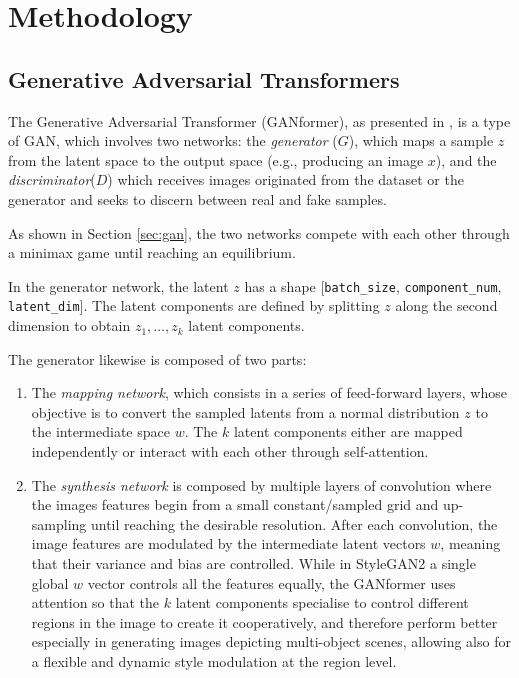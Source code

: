 \documentclass{article}
\begin{document}
	\section{Methodology}
	
	\subsection{Generative Adversarial Transformers}%
	The Generative Adversarial Transformer (GANformer), as presented in \cite{hudson2021generative}, 
	is a type of GAN, which involves two networks: the \textit{generator} (${G}$), which maps a sample 
	$z$ from the latent space to the output space (e.g., producing an image $x$), and the 
	\textit{discriminator}(${D}$) which receives images originated from the dataset or the generator and 
	seeks to discern between real and fake samples. 
	
	As shown in Section \ref{sec:gan}, the two networks compete with each other through a minimax 
	game until reaching an equilibrium. 
	
	In the generator network, the latent $z$ has a shape 
	[\texttt{batch\_size}, \texttt{component\_num}, \texttt{latent\_dim}]. 
	The latent components are defined by splitting $z$ along the second dimension to obtain $z_1, 
	\dots, z_k$ latent components.
	
	The generator likewise is composed of two parts:
	\begin{enumerate}
		\item The \textit{mapping network}, which consists in a series of feed-forward layers, whose 
		objective is to convert the sampled latents from a normal distribution $z$ to the intermediate 
		space $w$. The $k$ latent components either are mapped independently or interact with each 
		other through self-attention.
		\item The \textit{synthesis network} is composed by multiple layers of convolution where the 
		images features begin from a small constant/sampled grid and up-sampling until reaching the 
		desirable resolution.
		After each convolution, the image features are modulated by the intermediate latent vectors $w$, 
		meaning that their variance and bias are controlled. 
		While in StyleGAN2 a single global $w$ vector controls all the features equally, the GANformer 
		uses attention so that the $k$ latent components specialise to control different regions in the 
		image to create it cooperatively, and therefore perform better especially in generating images 
		depicting multi-object scenes, allowing also for a flexible and dynamic style modulation at the 
		region level.
	\end{enumerate}
	
\end{document}
